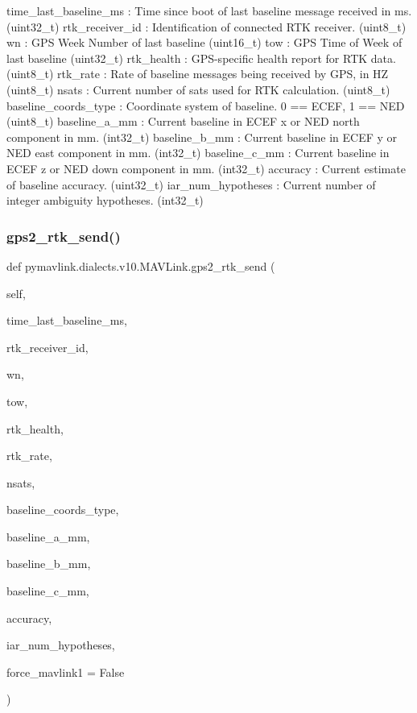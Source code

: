 \begin{DoxyVerb}
\begin{DoxyVerb}
\begin{DoxyVerb}
time_last_baseline_ms        : Time since boot of last baseline message received in ms. (uint32_t)
rtk_receiver_id           : Identification of connected RTK receiver. (uint8_t)
wn                        : GPS Week Number of last baseline (uint16_t)
tow                       : GPS Time of Week of last baseline (uint32_t)
rtk_health                : GPS-specific health report for RTK data. (uint8_t)
rtk_rate                  : Rate of baseline messages being received by GPS, in HZ (uint8_t)
nsats                     : Current number of sats used for RTK calculation. (uint8_t)
baseline_coords_type        : Coordinate system of baseline. 0 == ECEF, 1 == NED (uint8_t)
baseline_a_mm             : Current baseline in ECEF x or NED north component in mm. (int32_t)
baseline_b_mm             : Current baseline in ECEF y or NED east component in mm. (int32_t)
baseline_c_mm             : Current baseline in ECEF z or NED down component in mm. (int32_t)
accuracy                  : Current estimate of baseline accuracy. (uint32_t)
iar_num_hypotheses        : Current number of integer ambiguity hypotheses. (int32_t)\end{DoxyVerb}
 \mbox{\label{classpymavlink_1_1dialects_1_1v10_1_1MAVLink_a16ff394540825c7fadf4d444107b420e}} 
\subsubsection{\texorpdfstring{gps2\+\_\+rtk\+\_\+send()}{gps2\_rtk\_send()}}
{\footnotesize\ttfamily def pymavlink.\+dialects.\+v10.\+M\+A\+V\+Link.\+gps2\+\_\+rtk\+\_\+send (\begin{DoxyParamCaption}\item[{}]{self,  }\item[{}]{time\+\_\+last\+\_\+baseline\+\_\+ms,  }\item[{}]{rtk\+\_\+receiver\+\_\+id,  }\item[{}]{wn,  }\item[{}]{tow,  }\item[{}]{rtk\+\_\+health,  }\item[{}]{rtk\+\_\+rate,  }\item[{}]{nsats,  }\item[{}]{baseline\+\_\+coords\+\_\+type,  }\item[{}]{baseline\+\_\+a\+\_\+mm,  }\item[{}]{baseline\+\_\+b\+\_\+mm,  }\item[{}]{baseline\+\_\+c\+\_\+mm,  }\item[{}]{accuracy,  }\item[{}]{iar\+\_\+num\+\_\+hypotheses,  }\item[{}]{force\+\_\+mavlink1 = {\ttfamily False} }\end{DoxyParamCaption})}


\end{DoxyVerb}
\end{DoxyVerb}
